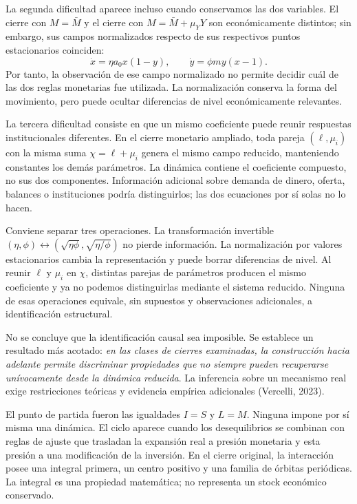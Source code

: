 \documentclass[10.5pt,twoside]{article}
\newcounter{rsec}
\newcommand{\rsection}{%
  \refstepcounter{rsec}%
  \par\vspace{1.35em}%
  \begin{center}\fontsize{14}{16}\selectfont\Roman{rsec}\end{center}%
  \vspace{0.35em}%
}
\begin{document}
La segunda dificultad aparece incluso cuando conservamos las dos variables. El cierre con $M=\bar M$ y el cierre con $M=\bar M+\mu_YY$ son económicamente distintos; sin embargo, sus campos normalizados respecto de sus respectivos puntos estacionarios coinciden:
\[
 \dot x=\eta a_0x(1-y),\qquad
 \dot y=\phi my(x-1).
\]
Por tanto, la observación de ese campo normalizado no permite decidir cuál de las dos reglas monetarias fue utilizada. La normalización conserva la forma del movimiento, pero puede ocultar diferencias de nivel económicamente relevantes.

La tercera dificultad consiste en que un mismo coeficiente puede reunir respuestas institucionales diferentes. En el cierre monetario ampliado, toda pareja $(\ell,\mu_i)$ con la misma suma $\chi=\ell+\mu_i$ genera el mismo campo reducido, manteniendo constantes los demás parámetros. La dinámica contiene el coeficiente compuesto, no sus dos componentes. Información adicional sobre demanda de dinero, oferta, balances o instituciones podría distinguirlos; las dos ecuaciones por sí solas no lo hacen.

Conviene separar tres operaciones. La transformación invertible $(\eta,\phi)\leftrightarrow(\sqrt{\eta\phi},\sqrt{\eta/\phi})$ no pierde información. La normalización por valores estacionarios cambia la representación y puede borrar diferencias de nivel. Al reunir $\ell$ y $\mu_i$ en $\chi$, distintas parejas de parámetros producen el mismo coeficiente y ya no podemos distinguirlas mediante el sistema reducido. Ninguna de esas operaciones equivale, sin supuestos y observaciones adicionales, a identificación estructural.

No se concluye que la identificación causal sea imposible. Se establece un resultado más acotado: \emph{en las clases de cierres examinadas, la construcción hacia adelante permite discriminar propiedades que no siempre pueden recuperarse unívocamente desde la dinámica reducida}. La inferencia sobre un mecanismo real exige restricciones teóricas y evidencia empírica adicionales (Vercelli, 2023).

\rsection
El punto de partida fueron las igualdades $I=S$ y $L=M$. Ninguna impone por sí misma una dinámica. El ciclo aparece cuando los desequilibrios se combinan con reglas de ajuste que trasladan la expansión real a presión monetaria y esta presión a una modificación de la inversión. En el cierre original, la interacción posee una integral primera, un centro positivo y una familia de órbitas periódicas. La integral es una propiedad matemática; no representa un stock económico conservado.
\end{document}
